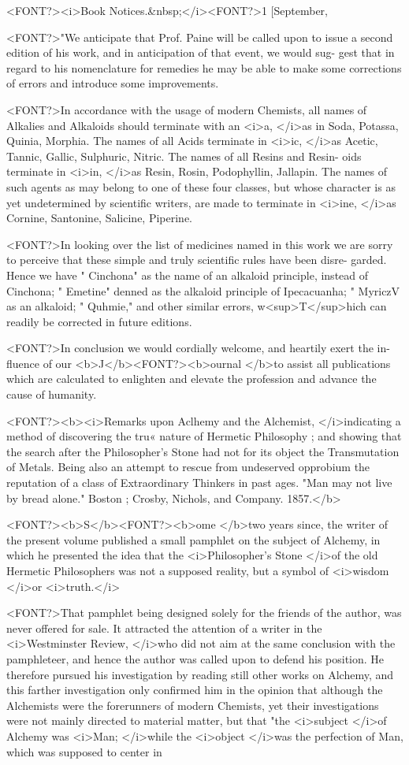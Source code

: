 <FONT?><i>Book Notices.&nbsp;</i><FONT?>1 [September,

<FONT?>"We anticipate that Prof. Paine will be called upon to issue a second
edition of his work, and in anticipation of that event, we would sug-
gest that in regard to his nomenclature for remedies he may be able to
make some corrections of errors and introduce some improvements.

<FONT?>In accordance with the usage of modern Chemists, all names of
Alkalies and Alkaloids should terminate with an <i>a, </i>as in Soda, Potassa,
Quinia, Morphia. The names of all Acids terminate in <i>ic, </i>as Acetic,
Tannic, Gallic, Sulphuric, Nitric. The names of all Resins and Resin-
oids terminate in <i>in, </i>as Resin, Rosin, Podophyllin, Jallapin. The
names of such agents as may belong to one of these four classes, but
whose character is as yet undetermined by scientific writers, are made
to terminate in <i>ine, </i>as Cornine, Santonine, Salicine, Piperine.

<FONT?>In looking over the list of medicines named in this work we are sorry
to perceive that these simple and truly scientific rules have been disre-
garded. Hence we have " Cinchona" as the name of an alkaloid
principle, instead of Cinchona; " Emetine" denned as the alkaloid
principle of Ipecacuanha; " MyriczV as an alkaloid; " Quhmie,"
and other similar errors, w<sup>T</sup>hich can readily be corrected in future editions.

<FONT?>In conclusion we would cordially welcome, and heartily exert the in-
fluence of our <b>J</b><FONT?><b>ournal </b>to assist all publications which are calculated to
enlighten and elevate the profession and advance the cause of humanity.

<FONT?><b><i>Remarks upon Aclhemy and the Alchemist, </i>indicating a method of discovering the tru«
nature of Hermetic Philosophy ; and showing that the search after the Philosopher's
Stone had not for its object the Transmutation of Metals. Being also an attempt to
rescue from undeserved opprobium the reputation of a class of Extraordinary Thinkers
in past ages. "Man may not live by bread alone." Boston ; Crosby, Nichols, and
Company. 1857.</b>

<FONT?><b>S</b><FONT?><b>ome </b>two years since, the writer of the present volume published a
small pamphlet on the subject of Alchemy, in which he presented the
idea that the <i>Philosopher's Stone </i>of the old Hermetic Philosophers
was not a supposed reality, but a symbol of <i>wisdom </i>or <i>truth.</i>

<FONT?>That pamphlet being designed solely for the friends of the author, was
never offered for sale. It attracted the attention of a writer in the
<i>Westminster Review, </i>who did not aim at the same conclusion with
the pamphleteer, and hence the author was called upon to defend his
position. He therefore pursued his investigation by reading still
other works on Alchemy, and this farther investigation only confirmed
him in the opinion that although the Alchemists were the forerunners
of modern Chemists, yet their investigations were not mainly directed
to material matter, but that "the <i>subject </i>of Alchemy was <i>Man; </i>while
the <i>object </i>was the perfection of Man, which was supposed to center in\endinput
